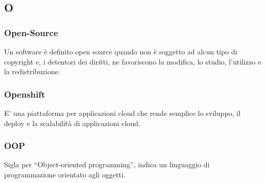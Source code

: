 \subsection*{\textbf{\hfill \Huge{O} \hfill}} 

\subsubsection*{Open-Source}
Un software è definito open source quando non è soggetto ad alcun tipo di copyright e, i detentori dei diritti, ne favoriscono la modifica, lo studio, l'utilizzo e la redistribuzione.

\subsubsection*{Openshift}
E' una piattaforma per applicazioni cloud che rende semplice lo sviluppo, il deploy e la scalabilità di applicazioni cloud.

\subsubsection*{OOP}
Sigla per ``Object-oriented programming'', indica un linguaggio di programmazione orientato agli oggetti.

